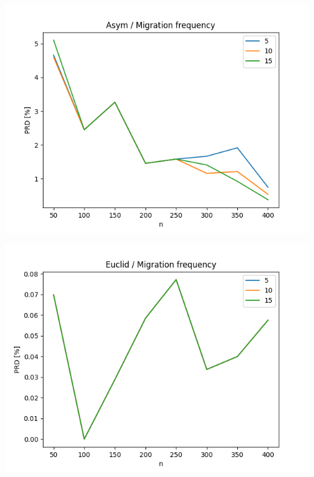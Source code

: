 \documentclass{article}
\begin{document}
\begin{center}
\includegraphics[width=\textwidth, 
                   height = 0.4\textheight, 
                   keepaspectratio]
                  {plots/asym_11_migration_freq} 
\end{center}

\begin{center}
\includegraphics[width=\textwidth, 
                   height = 0.4\textheight, 
                   keepaspectratio]
                  {plots/euclid_11_migration_freq} 
\end{center}
\end{document}
